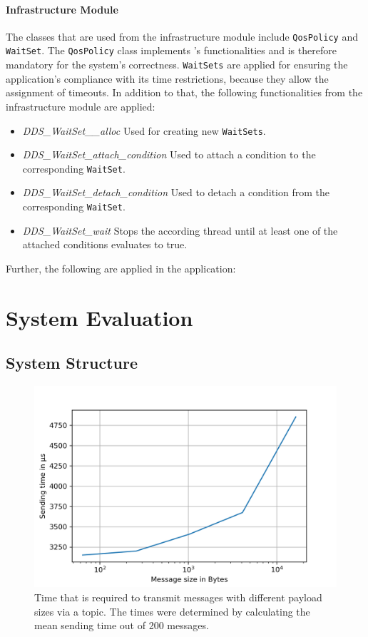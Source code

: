\paragraph{Infrastructure Module}
The classes that are used from the infrastructure module include \texttt{QosPolicy} and \texttt{WaitSet}.
The \texttt{QosPolicy} class implements 's  functionalities and is therefore mandatory for the system's correctness.
\texttt{WaitSets} are applied for ensuring the application's compliance with its time restrictions, because they allow the assignment of timeouts.
In addition to that, the following functionalities from the infrastructure module are applied:

\begin{itemize}
\item \textit{DDS\_WaitSet\_\_alloc} Used for creating new \texttt{WaitSets}.
\item \textit{DDS\_WaitSet\_attach\_condition} Used to attach a condition to the corresponding \texttt{WaitSet}.
\item \textit{DDS\_WaitSet\_detach\_condition} Used to detach a condition from the corresponding \texttt{WaitSet}.
\item \textit{DDS\_WaitSet\_wait} Stops the according thread until at least one of the attached conditions evaluates to true.
\end{itemize}

Further, the following  are applied in the application:


\section{System Evaluation}


\subsection{System Structure}
\begin{figure}[!hb]
	\centering
	\includegraphics[width=0.75\linewidth]{images/plots/sendingTimes}
	\caption{Time that is required to transmit messages with different payload sizes via a  topic. The times were determined by calculating the mean sending time out of 200 messages.}
	\label{fig:PlotSendingTimes}
\end{figure}

